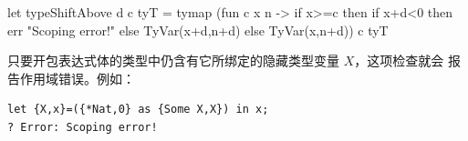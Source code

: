 \begin{taplocamlcode}
let typeShiftAbove d c tyT =
  tymap
    (fun c x n ->
      if x>=c then
        if x+d<0 then err "Scoping error!"
        else TyVar(x+d,n+d)
      else TyVar(x,n+d))
    c tyT
\end{taplocamlcode}

只要开包表达式体的类型中仍含有它所绑定的隐藏类型变量 \(X\)，这项检查就会
报告作用域错误。例如：
\begin{lstlisting}
let {X,x}=({*Nat,0} as {Some X,X}) in x;
? Error: Scoping error!
\end{lstlisting}
